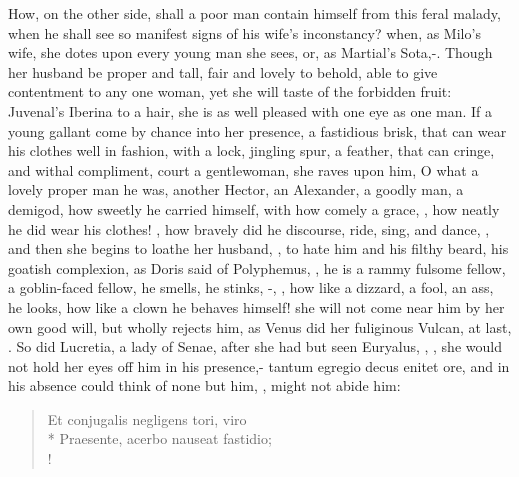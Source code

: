 How, on the other side, shall a poor man contain himself from this
feral malady, when he shall see so manifest signs of his wife's
inconstancy? when, as Milo's wife, she dotes upon every young man she
sees, or, as Martial's Sota,-. Though her husband be proper
and tall, fair and lovely to behold, able to give contentment to any
one woman, yet she will taste of the forbidden fruit: Juvenal's Iberina
to a hair, she is as well pleased with one eye as one man. If a young
gallant come by chance into her presence, a fastidious brisk, that can
wear his clothes well in fashion, with a lock, jingling spur, a
feather, that can cringe, and withal compliment, court a gentlewoman,
she raves upon him, O what a lovely proper man he was, another Hector,
an Alexander, a goodly man, a demigod, how sweetly he carried himself,
with how comely a grace, ,
how neatly he did wear his clothes! , how bravely did he discourse, ride, sing, and
dance, \etc{}, and then she begins to loathe her husband, , to hate him and his filthy beard, his goatish complexion, as
Doris said of Polyphemus, ,
he is a rammy fulsome fellow, a goblin-faced fellow, he smells, he
stinks, -,
\etc{}, how like a dizzard, a fool, an ass, he looks, how like a clown he
behaves himself! she will not come near him by her own good will,
but wholly rejects him, as Venus did her fuliginous Vulcan, at last,
. So did Lucretia,
a lady of Senae, after she had but seen Euryalus, , \etc{}, she would not hold her eyes off him in
his presence,- tantum egregio decus enitet ore, and in his
absence could think of none but him, ,
might not abide him:
%
\begin{latin}%
\begin{verse}%
Et conjugalis negligens tori, viro\\*
Praesente, acerbo nauseat fastidio;\\!
\end{verse}%
\end{latin}%

